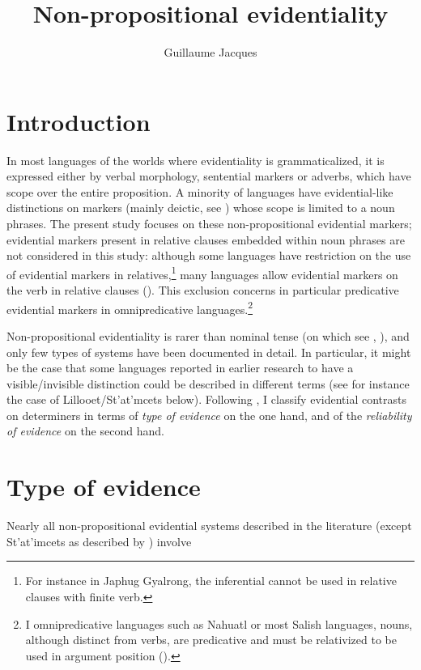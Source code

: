 \documentclass[oneside,a4paper,11pt]{article}
\begin{document}
 
\linenumbers

\title{Non-propositional evidentiality}
\author{Guillaume Jacques}
\maketitle

\section{Introduction}
In most languages of the worlds where evidentiality is grammaticalized, it is expressed either by verbal morphology, sentential markers or adverbs, which have scope over the entire proposition. A minority of languages have evidential-like distinctions on markers (mainly deictic, see \citealt[130]{aikhenvald06}) whose scope is limited to a noun phrases. The present study focuses on these non-propositional evidential markers; evidential markers present in relative clauses embedded within noun phrases are not considered in this study: although some languages have restriction on the use of evidential markers in relatives,\footnote{For instance in Japhug Gyalrong, the inferential cannot be used in relative clauses with finite verb.} many languages allow evidential markers on the verb in relative clauses (\citealt[253-6]{aikhenvald06}). This exclusion concerns in particular predicative evidential markers in omnipredicative languages.\footnote{I omnipredicative languages such as Nahuatl or most Salish languages, nouns, although distinct from verbs, are predicative and must be relativized to be used in argument position (\citealt{launey94}).}

Non-propositional evidentiality is rarer than nominal tense (on which see \citet{nordlinger04nominal}, \citealt[132]{francois05overview}), and only few types of systems have been documented in detail. In particular, it might be the case that some languages reported in earlier research to have a visible/invisible distinction could be described in different terms (see for instance the case of Lillooet/St'at'mcets below). Following \citet{gutierrez12determiners}, I classify evidential contrasts on determiners in terms of \textit{type of evidence} on the one hand, and of the \textit{reliability of evidence} on the second hand.

\section{Type of evidence}
Nearly all non-propositional evidential systems described in the literature (except St'at'imcets as described by \citet{gutierrez12determiners}) involve 
\end{document}
